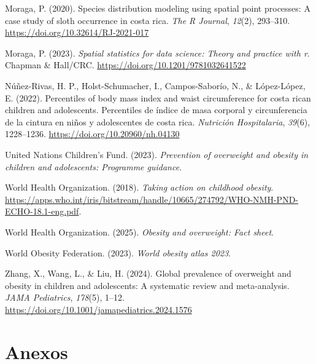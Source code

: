 \documentclass[
]{article}
\newlength{\cslhangindent}
\newenvironment{CSLReferences}[2] %
 {\begin{list}{}{%
  \setlength{\itemindent}{0pt}
  \setlength{\leftmargin}{0pt}
  \setlength{\parsep}{0pt}
  \ifodd #1
   \setlength{\leftmargin}{\cslhangindent}
   \setlength{\itemindent}{-1\cslhangindent}
  \fi
  \setlength{\itemsep}{#2\baselineskip}}}
 {\end{list}}
\begin{document}
\begin{CSLReferences}{1}{0}
Moraga, P. (2020). Species distribution modeling using spatial point
processes: A case study of sloth occurrence in costa rica. \emph{The R
Journal}, \emph{12}(2), 293--310.
\url{https://doi.org/10.32614/RJ-2021-017}

Moraga, P. (2023). \emph{Spatial statistics for data science: Theory and
practice with r}. Chapman \& Hall/CRC.
\url{https://doi.org/10.1201/9781032641522}

Núñez-Rivas, H. P., Holst-Schumacher, I., Campos-Saborío, N., \&
López-López, E. (2022). Percentiles of body mass index and waist
circumference for costa rican children and adolescents. Percentiles de
índice de masa corporal y circunferencia de la cintura en niños y
adolescentes de costa rica. \emph{Nutrición Hospitalaria}, \emph{39}(6),
1228--1236. \url{https://doi.org/10.20960/nh.04130}

United Nations Children's Fund. (2023). \emph{Prevention of overweight
and obesity in children and adolescents: Programme guidance}.

World Health Organization. (2018). \emph{Taking action on childhood
obesity}.
\url{https://apps.who.int/iris/bitstream/handle/10665/274792/WHO-NMH-PND-ECHO-18.1-eng.pdf}.

World Health Organization. (2025). \emph{Obesity and overweight: Fact
sheet}.

World Obesity Federation. (2023). \emph{World obesity atlas 2023}.

Zhang, X., Wang, L., \& Liu, H. (2024). Global prevalence of overweight
and obesity in children and adolescents: A systematic review and
meta-analysis. \emph{JAMA Pediatrics}, \emph{178}(5), 1--12.
\url{https://doi.org/10.1001/jamapediatrics.2024.1576}

\end{CSLReferences}

\section{Anexos}\label{anexos}
\end{document}
